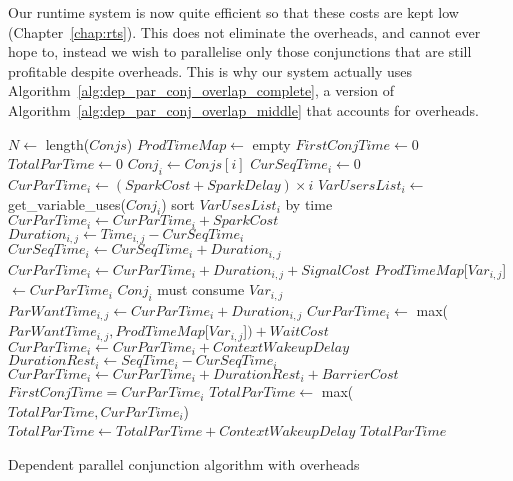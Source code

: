 Our runtime system is now quite efficient so that these
costs are kept low (Chapter~\ref{chap:rts}).
This does not eliminate the overheads, and cannot ever hope to,
instead we wish to parallelise only those conjunctions that are still
profitable despite overheads.
This is why our system actually uses
Algorithm~\ref{alg:dep_par_conj_overlap_complete},
a version of Algorithm~\ref{alg:dep_par_conj_overlap_middle}
that accounts for overheads.

\begin{algorithm}[tbp]
\begin{algorithmic}[5]
    \State $N \gets$ length($Conjs$)
    \State $ProdTimeMap \gets$ empty
    \State $FirstConjTime \gets 0$
    \State $TotalParTime \gets 0$
        \State $Conj_i \gets Conjs[i]$
        \State $CurSeqTime_i \gets 0$
        \State $CurParTime_i \gets (SparkCost + SparkDelay) \times i$
        \State $VarUsersList_i \gets$ get\_variable\_uses($Conj_i$)
        \State sort $VarUsesList_i$ by time
            \State $CurParTime_i \gets CurParTime_i + SparkCost$
        \EndIf
            \State $Duration_{i, j} \gets Time_{i, j} - CurSeqTime_i$
            \State $CurSeqTime_i \gets CurSeqTime_i + Duration_{i, j}$
                \State $CurParTime_i \gets
                    CurParTime_i + Duration_{i, j} + SignalCost$
                \State $ProdTimeMap$[$Var_{i, j}$]$ \gets CurParTime_i$
            \Else
                \Comment $Conj_i$ must consume $Var_{i, j}$
                \State $ParWantTime_{i, j} \gets CurParTime_i + Duration_{i, j}$
                \State $CurParTime_i \gets$
                    max($ParWantTime_{i, j}, ProdTimeMap$[$Var_{i, j}$]$) + WaitCost$
                    \State $CurParTime_i \gets CurParTime_i + ContextWakeupDelay$
                \EndIf
            \EndIf
        \EndFor
        \State $DurationRest_i \gets SeqTime_i - CurSeqTime_i$
        \State $CurParTime_i \gets CurParTime_i + DurationRest_i + BarrierCost$
            \State $FirstConjTime = CurParTime_i$
        \EndIf
        \State $TotalParTime \gets$ max($TotalParTime, CurParTime_i$)
    \EndFor
        \State $TotalParTime \gets TotalParTime + ContextWakeupDelay$
    \EndIf
    \State \Return $TotalParTime$
\EndProcedure
\end{algorithmic}
\caption{Dependent parallel conjunction algorithm with overheads}
\label{alg:dep_par_conj_overlap_complete}
\end{algorithm}

